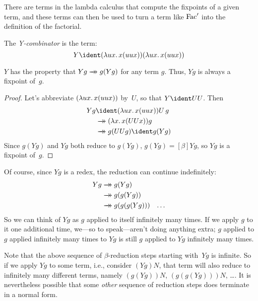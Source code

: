 \documentclass[../../../include/open-logic-section]{subfiles}
\begin{document}
There are terms in the lambda calculus that compute the fixpoints of a
given term, and these terms can then be used to turn a term like
$\mathrm{Fac}'$ into the definition of the factorial. 

\begin{defn}
  The \emph{Y-combinator} is the term:
  \[
  Y \ident (\lambd[ux][x(uux)])(\lambd[ux][x(uux)])
  \]
\end{defn}

\begin{thm}
  $Y$ has the property that $Yg \red g(Yg)$ for any term $g$. Thus,
  $Yg$ is always a fixpoint of~$g$.
\end{thm}

\begin{proof}
  Let's abbreviate $(\lambd[ux][x(uux)])$ by~$U$, so that $Y \ident UU$. Then
  \begin{align*}
    Y g &\ident (\lambd[ux][x(uux)])U\,g \\
    &\red (\lambd[x][x(UUx)])g\\
    & \red g(UUg) \ident g(Yg)
  \end{align*}
  Since $g(Yg)$ and $Yg$ both reduce to $g(Yg)$, $g(Yg) \equal[\beta]
  Yg$, so $Yg$ is a fixpoint of~$g$.
\end{proof}

Of course, since $Yg$ is a redex, the reduction can continue indefinitely:
\begin{align*}
  Y g &\red g (Y g) \\
    &\red g (g (Y g)) \\
    &\red g(g (g (Y g)))
    &\ldots
\end{align*}
So we can think of $Yg$ as $g$ applied to itself infinitely many
times. If we apply $g$ to it one additional time, we---so to
speak---aren't doing anything extra; $g$ applied to $g$ applied
infinitely many times to $Yg$ is still $g$ applied to $Yg$ infinitely
many times.

Note that the above sequence of $\beta$-reduction steps starting
with~$Yg$ is infinite. So if we apply $Yg$ to some term, i.e.,
consider $(Yg)N$, that term will also reduce to infinitely many
different terms, namely $(g(Yg))N$, $(g(g(Yg)))N$, \dots. It is
nevertheless possible that some \emph{other} sequence of reduction
steps does terminate in a normal form.
\end{document}
